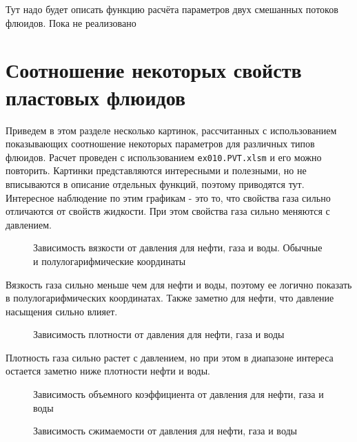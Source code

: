 Тут надо будет описать функцию расчёта параметров двух смешанных потоков флюидов. Пока не реализовано



\section{Соотношение некоторых свойств пластовых флюидов}
Приведем в этом разделе несколько картинок, рассчитанных с использованием \unf{} показывающих соотношение некоторых параметров для различных типов флюидов. Расчет проведен с использованием \texttt{ex010.PVT.xlsm} и его можно повторить.
Картинки представляются интересными и полезными, но не вписываются в описание отдельных функций, поэтому приводятся тут.
Интересное наблюдение по этим графикам - это то, что свойства газа сильно отличаются от свойств жидкости. При этом свойства газа сильно меняются с давлением. 

\begin{figure}[H]
	\caption{Зависимость вязкости от давления для нефти, газа и воды. Обычные и полулогарифмические координаты}
	\label{ris:viscosity_plot}
\end{figure}

Вязкость газа сильно меньше чем для нефти и воды, поэтому ее логично показать в полулогарифмических координатах. Также заметно для нефти, что давление насыщения сильно влияет.

\begin{figure}[H]
	\caption{Зависимость плотности от давления для нефти, газа и воды}
	\label{ris:density_plot}
\end{figure}

Плотность газа сильно растет с давлением, но при этом в диапазоне интереса остается заметно ниже плотности нефти и воды.

\begin{figure}[H]
	\caption{Зависимость объемного коэффициента от давления для нефти, газа и воды}
	\label{ris:FVF_plot}
\end{figure}

\begin{figure}[H]
	\caption{Зависимость сжимаемости от давления для нефти, газа и воды}
	\label{ris:compressibility_plot}
\end{figure}

